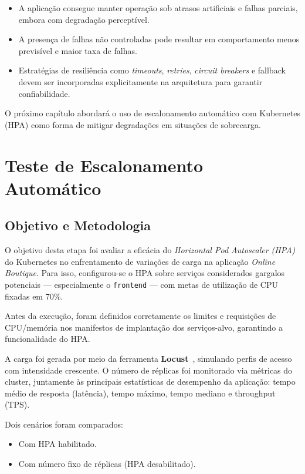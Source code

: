 \documentclass[12pt,a4paper]{report}
\begin{document}
\begin{itemize}
    \item A aplicação consegue manter operação sob atrasos artificiais e falhas parciais, embora com degradação perceptível.
    \item A presença de falhas não controladas pode resultar em comportamento menos previsível e maior taxa de falhas.
    \item Estratégias de resiliência como \textit{timeouts}, \textit{retries}, \textit{circuit breakers} e fallback devem ser incorporadas explicitamente na arquitetura para garantir confiabilidade.
\end{itemize}

O próximo capítulo abordará o uso de escalonamento automático com Kubernetes (HPA) como forma de mitigar degradações em situações de sobrecarga.


\chapter{Teste de Escalonamento Automático}

\section{Objetivo e Metodologia}

O objetivo desta etapa foi avaliar a eficácia do \textit{Horizontal Pod Autoscaler (HPA)} do Kubernetes no enfrentamento de variações de carga na aplicação \textit{Online Boutique}. Para isso, configurou-se o HPA sobre serviços considerados gargalos potenciais — especialmente o \texttt{frontend} — com metas de utilização de CPU fixadas em 70\%.

Antes da execução, foram definidos corretamente os limites e requisições de CPU/memória nos manifestos de implantação dos serviços-alvo, garantindo a funcionalidade do HPA.

A carga foi gerada por meio da ferramenta \textbf{Locust}~\cite{locust2025, locust_github}, simulando perfis de acesso com intensidade crescente. O número de réplicas foi monitorado via métricas do cluster, juntamente às principais estatísticas de desempenho da aplicação: tempo médio de resposta (latência), tempo máximo, tempo mediano e throughput (TPS).

Dois cenários foram comparados:
\begin{itemize}
    \item Com HPA habilitado.
    \item Com número fixo de réplicas (HPA desabilitado).
\end{itemize}
\end{document}
